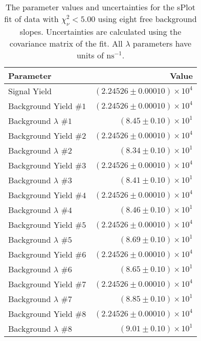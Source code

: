 
\begin{table}[ht]
    \begin{center}
        \begin{tabular}{lr}\toprule
            Parameter & Value \\\midrule
            Signal Yield & $(2.24526 \pm 0.00010) \times 10^{4}$ \\
            Background Yield $\#1$ & $(2.24526 \pm 0.00010) \times 10^{4}$ \\
            Background $\lambda$ $\#1$ & $(8.45 \pm 0.10) \times 10^{1}$ \\
            Background Yield $\#2$ & $(2.24526 \pm 0.00010) \times 10^{4}$ \\
            Background $\lambda$ $\#2$ & $(8.34 \pm 0.10) \times 10^{1}$ \\
            Background Yield $\#3$ & $(2.24526 \pm 0.00010) \times 10^{4}$ \\
            Background $\lambda$ $\#3$ & $(8.41 \pm 0.10) \times 10^{1}$ \\
            Background Yield $\#4$ & $(2.24526 \pm 0.00010) \times 10^{4}$ \\
            Background $\lambda$ $\#4$ & $(8.46 \pm 0.10) \times 10^{1}$ \\
            Background Yield $\#5$ & $(2.24526 \pm 0.00010) \times 10^{4}$ \\
            Background $\lambda$ $\#5$ & $(8.69 \pm 0.10) \times 10^{1}$ \\
            Background Yield $\#6$ & $(2.24526 \pm 0.00010) \times 10^{4}$ \\
            Background $\lambda$ $\#6$ & $(8.65 \pm 0.10) \times 10^{1}$ \\
            Background Yield $\#7$ & $(2.24526 \pm 0.00010) \times 10^{4}$ \\
            Background $\lambda$ $\#7$ & $(8.85 \pm 0.10) \times 10^{1}$ \\
            Background Yield $\#8$ & $(2.24526 \pm 0.00010) \times 10^{4}$ \\
            Background $\lambda$ $\#8$ & $(9.01 \pm 0.10) \times 10^{1}$ \\\bottomrule
        \end{tabular}
        \caption{The parameter values and uncertainties for the sPlot fit of data with $\chi^2_\nu < 5.00$ using eight free background slopes. Uncertainties are calculated using the covariance matrix of the fit. All $\lambda$ parameters have units of $\si{\nano\second}^{-1}$.}\label{tab:splot-fit-results-chisqdof-5.00-free-8}
    \end{center}
\end{table}

